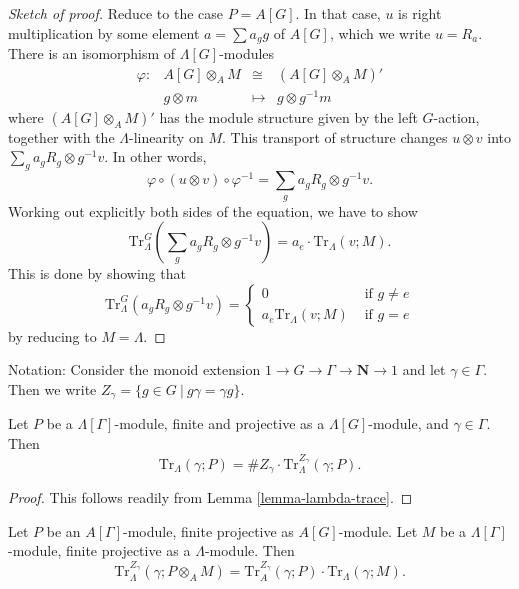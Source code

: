 \begin{proof}[Sketch of proof]
Reduce to the case $P=A[G]$. In that case, $u$ is right multiplication by some
element $a = \sum a_gg$ of $A[G]$, which we write $u = R_a$. There is an
isomorphism of $\Lambda[G]$-modules
$$
\begin{matrix}
\varphi: &A[G]\otimes_A M &\cong &\left(A[G]\otimes_A M\right)'\\
&g \otimes m &\longmapsto & g \otimes g^{-1}m
\end{matrix}
$$
where $\left(A[G]\otimes_A M\right)'$ has the module structure given by the
left $G$-action, together with the $\Lambda$-linearity on $M$. This transport
of structure changes $u \otimes v$ into $\sum_ga_gR_g \otimes g^{-1}v$. In other
words,
$$
\varphi \circ (u \otimes v) \circ \varphi^{-1}
=
\sum_ga_gR_g \otimes g^{-1}v.
$$
Working out explicitly both sides of the equation, we have to show
$$
\text{Tr}_\Lambda^G\left(\sum_g a_gR_g \otimes g^{-1}v\right) = a_e\cdot
\text{Tr}_\Lambda(v; M).
$$
This is done by showing that
$$
\text{Tr}_\Lambda^G\left(a_gR_g \otimes g^{-1}v\right) =
\left\{
\begin{matrix}
0 & \text{ if } g\neq e\\
a_e\text{Tr}_\Lambda\left(v; M\right) & \text{ if }g=e
\end{matrix}
\right.
$$
by reducing to $M=\Lambda$.
\end{proof}

\noindent
Notation:
Consider the monoid extension $1 \to G\to \Gamma\to \mathbf{N} \to 1$ and let
$\gamma\in \Gamma$.
Then we write $Z_\gamma = \{g\in G\ | \ g\gamma=\gamma g\}$.

\begin{lemma}
\label{lemma-gamma-z-gamma-trace}
Let $P$ be a $\Lambda[\Gamma]$-module, finite and projective as a
$\Lambda[G]$-module, and $\gamma \in \Gamma$. Then
$$
\text{Tr}_{\Lambda}(\gamma; P) =
\# Z_\gamma \cdot \text{Tr}_\Lambda^{Z_\gamma}\left(\gamma; P\right).
$$	
\end{lemma}

\begin{proof}
This follows readily from Lemma \ref{lemma-lambda-trace}.
\end{proof}

\begin{lemma}
\label{lemma-weak-trace}
Let $P$ be an $A[\Gamma]$-module, finite projective as $A[G]$-module. Let $M$
be a $\Lambda[\Gamma]$-module, finite projective as a $\Lambda$-module. Then
$$
\text{Tr}_{\Lambda}^{Z_\gamma}(\gamma; P \otimes_A M) = \text{Tr}_A^{Z_\gamma}
(\gamma;P)\cdot \text{Tr}_\Lambda(\gamma; M).
$$
\end{lemma}

